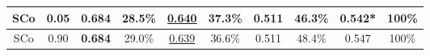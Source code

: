 \begin{table}[!t]
\begin{tabular}{|@{}c@{}|@{}c@{}||@{}c@{}|@{}c@{}||@{}c@{}|@{}c@{}||@{}c@{}|@{}c@{}||@{}c@{}||@{}c@{}|}
SCo & 0.05 & \bf{0.684} & 28.5\%
&\underline{0.640} & 37.3\%
& 0.511	&46.3\%
&0.542* & 100\%
\\
\hline SCo& 0.90 & \bf{0.684} & 29.0\% 
&\underline{0.639} & 36.6\%
& 0.511	&48.4\%
&0.547 &
100\%
\\
\hline

\end{tabular}
\end{table}



